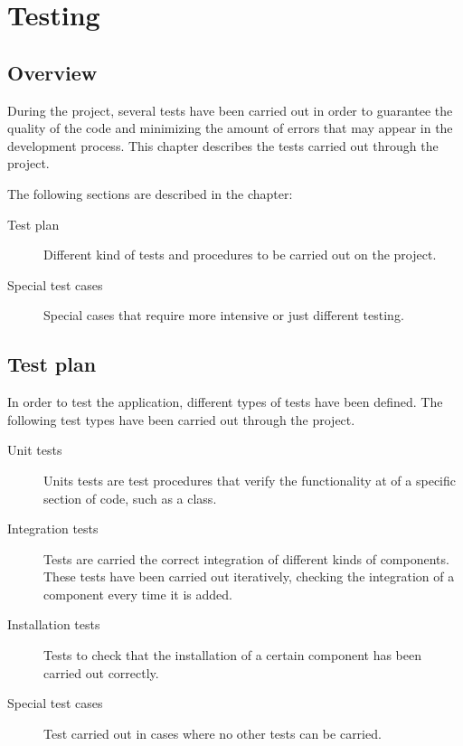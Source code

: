 \chapter{Testing}\label{ch:testing}

\section{Overview}

During the project, several tests have been carried out in order to guarantee the quality of the code and minimizing the amount of errors that may appear in the development process. This chapter describes the tests carried out through the project.

The following sections are described in the chapter:

\begin{description}
\item[Test plan] Different kind of tests and procedures to be carried out on the project.
\item[Special test cases] Special cases that require more intensive or just different testing.
\end{description}

\section{Test plan}

In order to test the application, different types of tests have been defined. The following test types have been carried out through the project.

\begin{description}
\item[Unit tests] Units tests are test procedures that verify the functionality at of a specific section of code, such as a class.

\item[Integration tests] Tests are carried the correct integration of different kinds of components. These tests have been carried out iteratively, checking the integration of a component every time it is added.

\item[Installation tests] Tests to check that the installation of a certain component has been carried out correctly.

\item[Special test cases] Test carried out in cases where no other tests can be carried.
\end{description}

